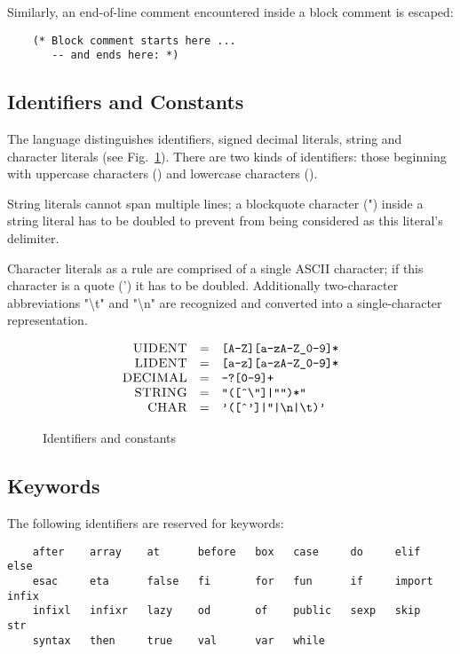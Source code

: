 Similarly, an end-of-line comment encountered inside a block comment is escaped:

\begin{lstlisting}
    (* Block comment starts here ...
       -- and ends here: *)
\end{lstlisting}

\subsection{Identifiers and Constants}

The language distinguishes identifiers, signed decimal literals, string and character literals (see Fig.~\ref{idents_and_consts}). There are
two kinds of identifiers: those beginning with uppercase characters () and lowercase characters ().

String literals cannot span multiple lines; a blockquote character (") inside a string literal has to be doubled to prevent from
being considered as this literal's delimiter.

Character literals as a rule are comprised of a single \textsc{ASCII} character; if this character is a quote (') it has to be doubled. Additionally
two-character abbreviations "\textbackslash t" and "\textbackslash n" are recognized and converted into a single-character representation.

\begin{figure}[t]
  \[
  \begin{array}{rcl}
    \textsc{UIDENT} & = &\mbox{\texttt{[A-Z][a-zA-Z\_0-9]*}}\\
    \textsc{LIDENT} & = &\mbox{\texttt{[a-z][a-zA-Z\_0-9]*}}\\
    \textsc{DECIMAL}& = &\mbox{\texttt{-?[0-9]+}}\\
    \textsc{STRING} & = &\mbox{\texttt{"([\^{}\textbackslash"]|"")*"}}\\
    \textsc{CHAR}   & = &\mbox{\texttt{'([\^{}']|''|\textbackslash n|\textbackslash t)'}}
  \end{array}
  \]
  \caption{Identifiers and constants}
  \label{idents_and_consts}
\end{figure}


\subsection{Keywords}

The following identifiers are reserved for keywords:

\begin{lstlisting}
    after    array    at      before   box   case     do     elif     else
    esac     eta      false   fi       for   fun      if     import   infix
    infixl   infixr   lazy    od       of    public   sexp   skip     str
    syntax   then     true    val      var   while
\end{lstlisting}


